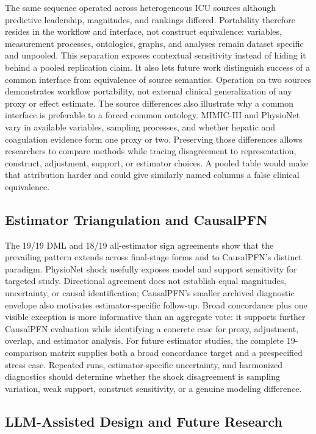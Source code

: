 \documentclass[letterpaper]{article}
\begin{document}
The same sequence operated across heterogeneous ICU sources although predictive
leadership, magnitudes, and rankings differed. Portability therefore resides in
the workflow and interface, not construct equivalence: variables, measurement
processes, ontologies, graphs, and analyses remain dataset specific and unpooled.
This separation exposes contextual sensitivity instead of hiding it behind a
pooled replication claim. It also lets future work distinguish success of a
common interface from equivalence of source semantics. Operation on two sources
demonstrates workflow portability, not external clinical generalization of any
proxy or effect estimate.
The source differences also illustrate why a common interface is preferable to
a forced common ontology. MIMIC-III and PhysioNet vary in available variables,
sampling processes, and whether hepatic and coagulation evidence form one proxy
or two. Preserving those differences allows researchers to compare methods while
tracing disagreement to representation, construct, adjustment, support, or
estimator choices. A pooled table would make that attribution harder and could
give similarly named columns a false clinical equivalence.

\subsection{Estimator Triangulation and CausalPFN}

The 19/19 DML and 18/19 all-estimator sign agreements show that the prevailing
pattern extends across final-stage forms and to CausalPFN's distinct paradigm.
PhysioNet shock usefully exposes model and support sensitivity for targeted
study. Directional agreement does not establish equal magnitudes, uncertainty,
or causal identification; CausalPFN's smaller archived diagnostic envelope
also motivates estimator-specific follow-up. Broad concordance plus one visible
exception is more informative than an aggregate vote: it supports further
CausalPFN evaluation while identifying a concrete case for proxy, adjustment,
overlap, and estimator analysis.
For future estimator studies, the complete 19-comparison matrix supplies both a
broad concordance target and a prespecified stress case. Repeated runs,
estimator-specific uncertainty, and harmonized diagnostics should determine
whether the shock disagreement is sampling variation, weak support, construct
sensitivity, or a genuine modeling difference.

\subsection{LLM-Assisted Design and Future Research}
\end{document}

